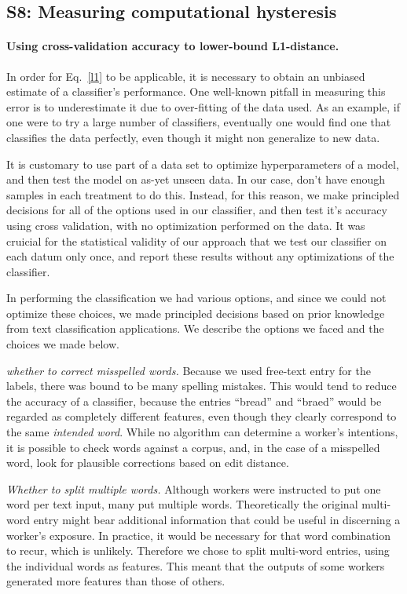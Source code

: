\documentclass[12pt]{article}
\begin{document}
\subsection*{S8: Measuring computational hysteresis}
	\paragraph{Using cross-validation accuracy to lower-bound L1-distance.}
	In order for Eq.~\ref{l1} to be applicable, it is necessary to obtain
	an unbiased estimate of a classifier's performance.  One well-known
	pitfall in measuring this error is to underestimate it due to 
	over-fitting of the data used.  As an example, if one were to try 
	a large number of classifiers, eventually one would find one that
	classifies the data perfectly, even though it might non generalize to
	new data.

	It is customary to use part of a data set to optimize hyperparameters of
	a model, and then test the model on as-yet unseen data.  In our case,
	don't have enough samples in each treatment to do this.  Instead, for 
	this reason, we make principled decisions for all of the options used
	in our classifier, and then test it's accuracy using cross validation,
	with no optimization performed on the data.  It was cruicial for 
	the statistical validity of our approach that we test our classifier on 
	each datum only once, and report these results without any optimizations
	of the classifier.

	In performing the classification we had various options, and since we
	could not optimize these choices, we made principled decisions based on
	prior knowledge from text classification applications.  We describe the
	options we faced and the choices we made below.
	
	\textit{whether to correct misspelled words.}  Because we used free-text
	entry for the labels, there was bound to be many spelling mistakes.
	This would tend to reduce the accuracy of a classifier, because the 
	entries ``bread'' and ``braed'' would be regarded as completely different
	features, even though they clearly correspond to the same 
	\textit{intended word}.  While no algorithm can determine a worker's 
	intentions, it is possible to check words against a corpus, and, in the
	case of a misspelled word, look for plausible corrections based on 
	edit distance.

	\textit{Whether to split multiple words.}  Although workers were 
	instructed to put one word per text input, many put multiple words.
	Theoretically the original multi-word entry might bear additional 
	information that could be useful in discerning a worker's exposure. 
	In practice, it would be necessary for that word combination to recur,
	which is unlikely.  Therefore we chose to split multi-word entries,
	using the individual words as features.  This meant that the outputs of
	some workers generated more features than those of others.
\end{document}
